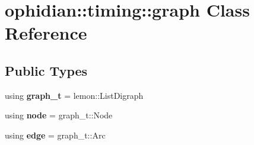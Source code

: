\hypertarget{classophidian_1_1timing_1_1graph}{\section{ophidian\-:\-:timing\-:\-:graph Class Reference}
\label{classophidian_1_1timing_1_1graph}
}
\subsection*{Public Types}
\begin{DoxyCompactItemize}
\item 
\hypertarget{classophidian_1_1timing_1_1graph_ac5ba3d472affc682190fb3d6e3828a6a}{using {\bfseries graph\-\_\-t} = lemon\-::\-List\-Digraph}\label{classophidian_1_1timing_1_1graph_ac5ba3d472affc682190fb3d6e3828a6a}

\item 
\hypertarget{classophidian_1_1timing_1_1graph_a3a4e786106f5ab1cabb3591777dc208d}{using {\bfseries node} = graph\-\_\-t\-::\-Node}\label{classophidian_1_1timing_1_1graph_a3a4e786106f5ab1cabb3591777dc208d}

\item 
\hypertarget{classophidian_1_1timing_1_1graph_a26cd3c6ff633e775ab6662ad274f9fd5}{using {\bfseries edge} = graph\-\_\-t\-::\-Arc}\label{classophidian_1_1timing_1_1graph_a26cd3c6ff633e775ab6662ad274f9fd5}

\end{DoxyCompactItemize}
